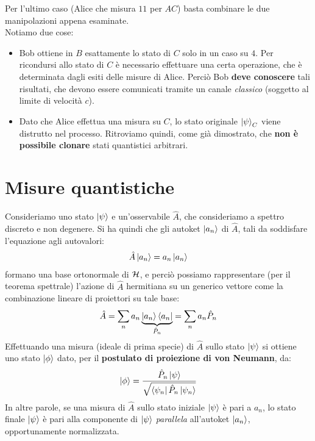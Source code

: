 \documentclass[../../InformazioneQuantistica.tex]{subfiles}
\begin{document}
Per l'ultimo caso (Alice che misura $11$ per $AC$) basta combinare le due manipolazioni appena esaminate.\\


Notiamo due cose:
\begin{itemize}
\item Bob ottiene in $B$ esattamente lo stato di $C$ solo in un caso su $4$. Per ricondursi allo stato di $C$ è necessario effettuare una certa operazione, che è determinata dagli esiti delle misure di Alice. Perciò Bob \textbf{deve conoscere} tali risultati, che devono essere comunicati tramite un canale \textit{classico} (soggetto al limite di velocità $c$).
\item Dato che Alice effettua una misura su $C$, lo stato originale $\Ket{\psi}_C$ viene distrutto nel processo. Ritroviamo quindi, come già dimostrato, che \textbf{non è possibile clonare} stati quantistici arbitrari.
\end{itemize}

\section{Misure quantistiche}
Consideriamo uno stato $\Ket{\psi}$ e un'osservabile $\hat{A}$, che consideriamo a spettro discreto e non degenere. Si ha quindi che gli autoket $\Ket{a_n}$ di $\hat{A}$, tali da soddisfare l'equazione agli autovalori:
\begin{align*}
\hat{A}\Ket{a_n} = a_n \Ket{a_n}
\end{align*}
formano una base ortonormale di $\mathcal{H}$, e perciò possiamo rappresentare (per il teorema spettrale) l'azione di $\hat{A}$ hermitiana su un generico vettore come la combinazione lineare di proiettori su tale base:
\begin{align*}
\hat{A} = \sum_n a_n \underbrace{\Ket{a_n}\Bra{a_n}}_{\hat{P}_n} = \sum_n a_n \hat{P}_n
\end{align*}
Effettuando una misura (ideale di prima specie) di $\hat{A}$ sullo stato $\Ket{\psi}$ si ottiene uno stato $\Ket{\phi}$ dato, per il \textbf{postulato di proiezione di von Neumann}, da:
\begin{align*}
\Ket{\phi} = \frac{\hat{P}_n \Ket{\psi}}{\sqrt{\Bra{\psi_n}\hat{P}_n \Ket{\psi_n}}}
\end{align*}
In altre parole, se una misura di $\hat{A}$ sullo stato iniziale $\Ket{\psi}$ è pari a $a_n$, lo stato finale $\Ket{\psi}$ è pari alla componente di $\Ket{\psi}$ \textit{parallela} all'autoket $\Ket{a_n}$, opportunamente normalizzata.\\
\end{document}
